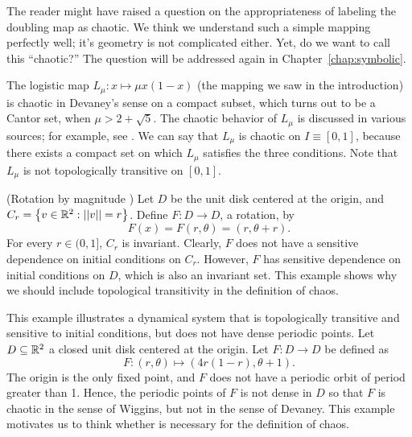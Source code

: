 \documentclass[12pt,draft,twoside]{book}
\begin{document}
The reader might have raised a question on the appropriateness of labeling the doubling map as chaotic.
We think we understand such a simple mapping perfectly well; it's geometry is not complicated either.
Yet, do we want to call this ``chaotic?''
The question will be addressed again in Chapter~\ref{chap:symbolic}.
\begin{example}
  The logistic map $L_\mu: x \mapsto \mu x(1-x)$ (the mapping we saw in the introduction) is chaotic in Devaney's sense on a compact subset, which turns out to be a Cantor set, when $\mu > 2 + \sqrt{5}$.
  The chaotic behavior of $L_\mu$ is discussed in various sources; for example, see \citet{sternberg}.
  We can say that $L_\mu$ is chaotic on $I \equiv [0,1]$, because there exists a compact set on which $L_\mu$ satisfies the three conditions.
  Note that $L_\mu$ is not topologically transitive on $[0,1]$.
\end{example} 
\begin{example}
  (Rotation by magnitude \citep{martelli})
  Let $D$ be the unit disk centered at the origin, and $C_r = \left \{ v \in \mathbb{R}^2: \left|\left| v \right|\right| = r \right \}$.
  Define $F: D \to D$, a rotation, by 
  \begin{equation*}
    F(x) = F(r, \theta) = (r, \theta + r).
  \end{equation*}
For every $r \in (0,1]$, $C_r$ is invariant.
Clearly, $F$ does not have a sensitive dependence on initial conditions on $C_r$.
However, $F$ has sensitive dependence on initial conditions on $D$, which is also an invariant set. 
This example shows why we should include topological transitivity in the definition of chaos.
\end{example}
\begin{example}
  \citep{martelli}
  This example illustrates a dynamical system that is topologically transitive and sensitive to initial conditions, but does not have dense periodic points.
  Let $D \subseteq \mathbb{R}^2$ a closed unit disk centered at the origin.
  Let $F: D \to D$ be defined as
  \begin{equation*}
    F: (r, \theta) \mapsto (4r(1 - r), \theta + 1).
  \end{equation*}
  The origin is the only fixed point, and $F$ does not have a periodic orbit of period greater than 1.
  Hence, the periodic points of $F$ is not dense in $D$ so that $F$ is chaotic in the sense of Wiggins, but not in the sense of Devaney.
  This example motivates us to think whether \dpp is necessary for the definition of chaos.
  \label{eg:notdpp}
\end{example}
\end{document}
